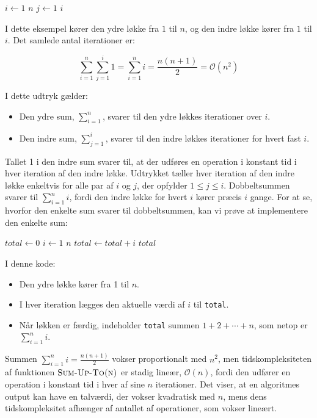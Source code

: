 \begin{example}

    \begin{codebox}
        \li \For $i \gets 1$ \To $n$ \Do
        \li     \For $j \gets 1$ \To $i$ \Do
        \li         {}
                \End
            \End
    \end{codebox}

I dette eksempel kører den ydre løkke fra $1$ til $n$, og den indre løkke kører fra $1$ til $i$. Det samlede antal iterationer er:

    \[
        \sum_{i=1}^n \sum_{j=1}^i 1 = \sum_{i=1}^{n} i = \frac{n(n + 1)}{2} = \mathcal{O}(n^2)
    \]

I dette udtryk gælder:
\begin{itemize}
    \item Den ydre sum, $\sum_{i=1}^n$, svarer til den ydre løkkes iterationer over $i$.
    \item Den indre sum, $\sum_{j=1}^i$, svarer til den indre løkkes iterationer for hvert fast $i$.
\end{itemize}

Tallet 1 i den indre sum svarer til, at der udføres en operation i konstant tid i hver iteration af den indre løkke. Udtrykket tæller hver iteration af den indre løkke enkeltvis for alle par af $i$ og $j$, der opfylder $1 \leq j \leq i$. Dobbeltsummen svarer til $\sum_{i=1}^n i$, fordi den indre løkke for hvert $i$ kører præcis $i$ gange. For at se, hvorfor den enkelte sum svarer til dobbeltsummen, kan vi prøve at implementere den enkelte sum:

\begin{codebox}
    \li $total \gets 0$
    \li \For $i \gets 1$ \To $n$ \Do
    \li     $total \gets total + i$
        \End
    \li \Return $total$
\end{codebox}

I denne kode:

\begin{itemize}
    \item Den ydre løkke kører fra 1 til $n$.
    \item I hver iteration lægges den aktuelle værdi af $i$ til \texttt{total}.
    \item Når løkken er færdig, indeholder \texttt{total} summen $1+2+\cdots+n$, som netop er $\sum_{i=1}^n i$.
\end{itemize}

Summen \( \sum_{i=1}^n i = \frac{n(n + 1)}{2} \) vokser proportionalt med \( n^2 \), men tidskompleksiteten af funktionen $\proc{Sum-Up-To(n)}$ er stadig lineær, \( \mathcal{O}(n) \), fordi den udfører en operation i konstant tid i hver af sine \( n \) iterationer. Det viser, at en algoritmes output kan have en talværdi, der vokser kvadratisk med \( n \), mens dens tidskompleksitet afhænger af antallet af operationer, som vokser lineært.

\end{example}

